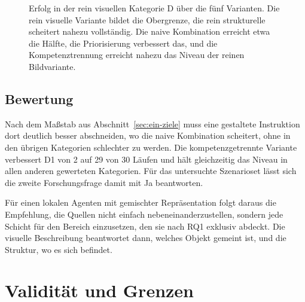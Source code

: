 \begin{figure}[htbp]
  \centering
  \caption{Erfolg in der rein visuellen Kategorie D über die fünf Varianten. Die rein visuelle Variante bildet die Obergrenze, die rein strukturelle scheitert nahezu vollständig. Die naive Kombination erreicht etwa die Hälfte, die Priorisierung verbessert das, und die Kompetenztrennung erreicht nahezu das Niveau der reinen Bildvariante.}
  \label{fig:kategorieD}
\end{figure}

\subsection*{Bewertung}

Nach dem Maßstab aus Abschnitt~\ref{sec:ein-ziele} muss eine gestaltete Instruktion dort deutlich besser abschneiden, wo die naive Kombination scheitert, ohne in den übrigen Kategorien schlechter zu werden.
Die kompetenzgetrennte Variante verbessert D1 von 2 auf 29 von 30 Läufen und hält gleichzeitig das Niveau in allen anderen gewerteten Kategorien.
Für das untersuchte Szenarioset lässt sich die zweite Forschungsfrage damit mit Ja beantworten.

Für einen lokalen Agenten mit gemischter Repräsentation folgt daraus die Empfehlung, die Quellen nicht einfach nebeneinanderzustellen, sondern jede Schicht für den Bereich einzusetzen, den sie nach RQ1 exklusiv abdeckt.
Die visuelle Beschreibung beantwortet dann, welches Objekt gemeint ist, und die Struktur, wo es sich befindet.


\section{Validität und Grenzen}
\label{sec:eval-validity}


